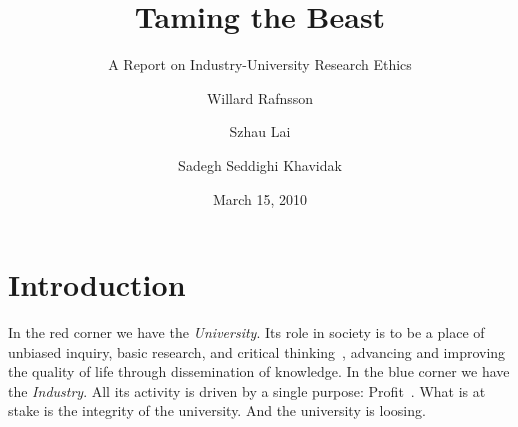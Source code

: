 \documentclass[draft,11pt,openright,monochrome,british,a4paper]{scrartcl}
\begin{document}
\title{Taming the Beast}
\subtitle{A Report on Industry-University Research Ethics}
\author{Willard Rafnsson \and Szhau Lai \and Sadegh Seddighi Khavidak}
\date{March 15, 2010}
\subject{Ethics, Science \& Society}
\maketitle

\section{Introduction}
In the red corner we have the \emph{University}. Its role in society
is to be a place of unbiased inquiry, basic research, and critical
thinking~\cite{washburn2001}, advancing and improving the quality of
life through dissemination of knowledge. In the blue corner we have
the \emph{Industry}. All its activity is driven by a single purpose:
Profit~\cite{pain2008}. What is at stake is the integrity of the
university. And the university is loosing.
\end{document}
